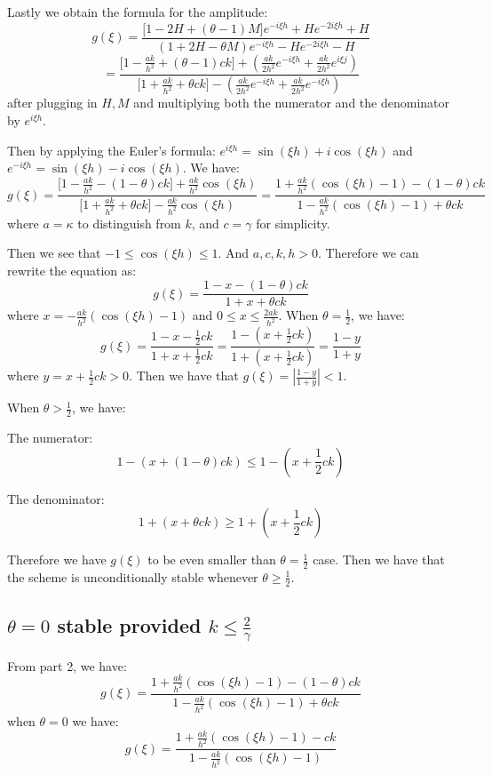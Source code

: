 \documentclass[12pt]{article}
\newcommand{\ka}{\kappa}
\newcommand{\ga}{\gamma}
\begin{document}
Lastly we obtain the formula for the amplitude:
$$
	g(\xi) = \frac{\big[1-2H+(\theta-1)M\big]e^{-i\xi h} + He^{-2i\xi h} + H}{(1+2H-\theta M)e^{-i\xi h} - He^{-2i\xi h} - H}
$$
$$
	= \frac{\big[1-\frac{ak}{h^2} + (\theta-1)ck\big] + (\frac{ak}{2h^2}e^{-i\xi h} + \frac{ak}{2h^2} e^{i\xi j})}{\big[ 1+\frac{ak}{h^2} + \theta ck \big] - (\frac{ak}{2h^2}e^{-i\xi h} + \frac{ak}{2h^2} e^{-i\xi h})}
$$ after plugging in $H,M$ and multiplying both the numerator and the denominator by $e^{i\xi h}$.

Then by applying the Euler's formula: $e^{i\xi h} = \sin{(\xi h)} + i\cos{(\xi h)}$ and $e^{-i\xi h} = \sin{(\xi h)} - i\cos{(\xi h)}$. We have:
\begin{equation}\label{von1}
	g(\xi) = \frac{\big[1-\frac{ak}{h^2} - (1-\theta)ck \big] + \frac{ak}{h^2}\cos{(\xi h)}}{\big[1+\frac{ak}{h^2} + \theta ck \big] - \frac{ak}{h^2}\cos{(\xi h)}}
	=
	\frac{1+ \frac{ak}{h^2}(\cos{(\xi h)} - 1) - (1-\theta)ck}{1- \frac{ak}{h^2}(\cos{(\xi h)} - 1) + \theta ck}
\end{equation} where $a = \ka$ to distinguish from $k$, and $c=\ga$ for simplicity.

Then we see that $-1 \le \cos{(\xi h)} \le 1$. And $a,c,k,h > 0$. Therefore we can rewrite the equation as:
$$
	g(\xi) = \frac{1 - x - (1-\theta)ck}{1 + x + \theta ck}
$$ where $x = -\frac{ak}{h^2}(\cos{(\xi h)} - 1)$ and $ 0 \le x \le \frac{2ak}{h^2}$. When $\theta = \frac12$, we have:
$$
	g(\xi) = \frac{1-x-\frac12 ck}{1 + x + \frac12 ck}
	=
	\frac{1-(x + \frac12 ck)}{1+(x + \frac12 ck)} = \frac{1-y}{1+y}
$$ where $y = x + \frac{1}{2}ck > 0$. Then we have that $g(\xi) = |\frac{1-y}{1+y}| < 1$.

When $\theta > \frac12$, we have:

The numerator:
$$
	1 - (x + (1-\theta) ck ) \le 1 - (x+ \frac12 ck)
$$

The denominator:
$$
	1 + (x + \theta ck) \ge 1 + (x+\frac12 ck)
$$

Therefore we have $g(\xi)$ to be even smaller than $\theta=\frac12$ case. Then we have that the scheme is unconditionally stable whenever $\theta \ge \frac12$.




\subsection{$\theta=0$ stable provided $k \le \frac{2}{\ga}$}

From part 2, we have:
$$
	g(\xi) = \frac{1+ \frac{ak}{h^2}(\cos{(\xi h)} - 1) - (1-\theta)ck}{1- \frac{ak}{h^2}(\cos{(\xi h)} - 1) + \theta ck}
$$ when $\theta = 0$ we have:
$$
	g(\xi) =\frac{1+ \frac{ak}{h^2}(\cos{(\xi h)} - 1) - ck}{1- \frac{ak}{h^2}(\cos{(\xi h)} - 1)}
$$
\end{document}
